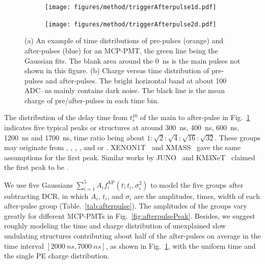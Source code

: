 \begin{figure}[!htbp]
    \centering
    \begin{subfigure}[t]{\LF\textwidth}
        \texttt{[image: figures/method/triggerAfterpulse1d.pdf]}
        \caption{}%
        \label{fig:afterpulse1d}
    \end{subfigure}
    \begin{subfigure}[t]{\LF\textwidth}
        \texttt{[image: figures/method/triggerAfterpulse2d.pdf]}
        \caption{}
        \label{fig:afterpulse2d}
    \end{subfigure}
    \caption{(a) An example of time distributions of pre-pulses (orange) and after-pulses (blue) for an MCP-PMT, the green line being the Gaussian fits. The blank area around the \SI{0}{ns} is the main pulses not shown in this figure. (b) Charge versus time distribution of pre-pulses and after-pulses. The bright horizontal band at about 100\,$\mathrm{ADC}\cdot \mathrm{ns}$ mainly contains dark noise. The black line is the mean charge of pre/after-pulses in each time bin.}
\end{figure}

The distribution of the delay time from $t_r^{10}$ of the main to after-pulse in Fig.~\ref{fig:afterpulse1d} indicates five typical peaks or structures at around \SI{300}{ns}, \SI{400}{ns}, \SI{600}{ns}, \SI{1200}{ns} and \SI{1700}{ns}, time ratio being about $1:\sqrt{2}:\sqrt{4}:\sqrt{16}:\sqrt{32}$. These groups may originate from , , , , and  or . XENON1T~\cite{XENON1TTesting} and XMASS~\cite{Abe_2020} gave the same assumptions for the first peak. Similar works by JUNO~\cite{Zhao:2022gks} and KM3NeT~\cite{KM3NetTesting} claimed the first peak to be .

We use five Gaussians $\sum_{i=1}^{5}{A_if_i^{\mathrm{AP}}(t;t_i,\sigma_i^2)}$ to model the five groups after subtracting DCR, in which $A_i$, $t_i$, and $\sigma_i$ are the amplitudes, times, width of each after-pulse group (Table.~\ref{tab:afterpulse}). The amplitudes of the groups vary greatly for different MCP-PMTs in Fig.~\ref{fig:afterpulsePeak}. Besides, we suggest roughly modeling the time and charge distribution of unexplained slow undulating structures contributing about half of the after-pulses on average in the time interval $[\SI{2000}{ns},\SI{7000}{ns}]$, as shown in Fig.~\ref{fig:afterpulse1d}, with the uniform time and the single PE charge distribution.

